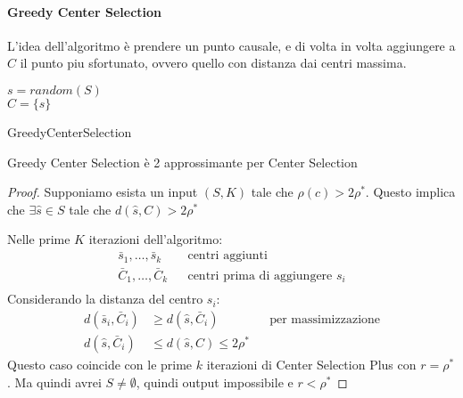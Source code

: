 \paragraph{Greedy Center Selection}
L'idea dell'algoritmo è prendere un punto causale, e di volta in volta 
aggiungere a $C$ il punto piu sfortunato, ovvero quello con distanza dai centri massima.

\begin{algorithm}[H]
    \SetAlgoLined

    $s = \mathit{random}(S)$\\
    $C = \{s\}$\\
     \caption{GreedyCenterSelection}
\end{algorithm}

\begin{theorem}
    Greedy Center Selection è 2 approssimante per Center Selection
\end{theorem}
\begin{proof}
    Supponiamo esista un input $(S,K)$ tale che $\rho(c) > 2\rho^*$.
    Questo implica che $\exists \hat{s} \in S$ tale che $d(\hat{s}, C) > 2\rho^*$ 

    Nelle prime $K$ iterazioni dell'algoritmo:
    \begin{equation}
        \begin{aligned}
            \bar{s}_1, \dots, \bar{s}_k && \text{centri aggiunti}\\
            \bar{C}_1, \dots, \bar{C}_k && \text{centri prima di aggiungere } s_i\\
        \end{aligned}
    \end{equation}
    Considerando la distanza del centro $s_i$:
    \begin{equation}
        \begin{aligned}
            d(\bar{s}_i,\bar{C}_i)&\geq d(\hat{s},\bar{C}_i) && \text{per massimizzazione}\\
            d(\hat{s},\bar{C}_i) &\leq d(\hat{s}, C) \leq 2\rho^*
        \end{aligned}
    \end{equation}
    Questo caso coincide con le prime $k$ iterazioni di Center Selection Plus con $r = \rho^*$.
    Ma quindi avrei $S \neq \emptyset$, quindi output impossibile e $r < \rho^*$
\end{proof}

